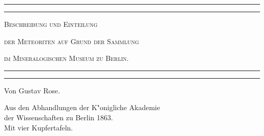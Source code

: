 \documentclass[a4paper, 11pt, oneside]{article}
\begin{document}
\frakfamily
\begin{titlepage} %
	\centering %

	
	\rule{\textwidth}{1.6pt}\vspace*{-\baselineskip}\vspace*{2pt} %
	\rule{\textwidth}{0.4pt} %
	
	\vspace{1.5\baselineskip} %
	
	{\scshape\Huge Beschreibung und Einteilung}
	
	\vspace{1\baselineskip} %

	{\scshape\Huge der Meteoriten auf Grund der Sammlung}

	\vspace{1\baselineskip} %

	{\scshape\Huge im Mineralogischen Museum zu Berlin.}

	\vspace{1.5\baselineskip} %

	\rule{\textwidth}{0.4pt}\vspace*{-\baselineskip}\vspace{3.2pt} %
	\rule{\textwidth}{1.6pt} %
	
	\vspace{1\baselineskip} %
	
	
	{\LARGE Von Gustav Rose.} %
	
	\vspace*{1\baselineskip} %
	
    {Aus den Abhandlungen der K"onigliche Akademie\\ der Wissenschaften zu Berlin 1863.\\Mit vier Kupfertafeln.} %
    
    \vspace*{\fill}


\end{titlepage}
\end{document}
